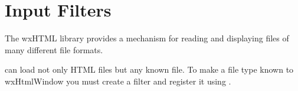 \section{Input Filters}\label{filters}

The wxHTML library provides a mechanism for reading and displaying
files of many different file formats. 

 can load not
only HTML files but any known file. To make a file type known to wxHtmlWindow
you must create a  filter and
register it using .


